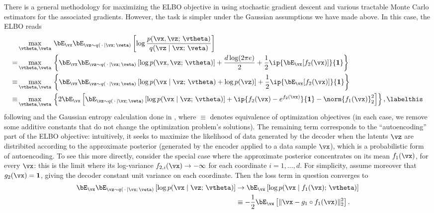 \documentclass[../../book-main.tex]{subfiles}
\begin{document}
There is a general methodology for maximizing the ELBO objective in
 using stochastic gradient descent and various tractable
Monte Carlo estimators for the associated gradients. However, the task is
simpler under the Gaussian assumptions we have made above. In this case, the
ELBO reads
\begin{align*}
&\max_{\vtheta, \veta}\,
\bE_{\vx}
\bE_{\vz \sim q(\,\cdot\, \mid \vx ;\, \veta)} \left[
  \log \frac{p(\vx, \vz;\, \vtheta)}{q(\vz \mid \vx;\, \veta)}
\right]\\
=&
\max_{\vtheta, \veta}\,
\left\{
  \bE_{\vx}
  \bE_{\vz \sim q(\,\cdot\, \mid \vx ;\, \veta)} \left[
    \log p(\vx, \vz;\, \vtheta)
  \right]
  + \frac{d \log(2\pi e)}{2}
  + \frac{1}{2} \ip{ \bE_{\vx}[f_2(\vx)]}{\mathbf{1}}
\right\}
\\
\equiv &
\max_{\vtheta, \veta}\,
\left\{
  \bE_{\vx}
  \bE_{\vz \sim q(\,\cdot\, \mid \vx ;\, \veta)} \left[
    \log p(\vx \mid \vz;\, \vtheta)
    + \log p(\vz)
  \right]
  + \frac{1}{2} \ip{ \bE_{\vx}[f_2(\vx)]}{\mathbf{1}}
\right\}
\\
\equiv &
\max_{\vtheta, \veta}\,
\left\{
  2\bE_{\vx}\left[
    \bE_{\vz \sim q(\,\cdot\, \mid \vx ;\, \veta)} \left[
      \log p(\vx \mid \vz;\, \vtheta)
    \right]
    + \ip{ f_2(\vx) - e^{f_2(\vx)}}{\mathbf{1}}
    - \norm{f_1(\vx)}_2^2
  \right]
\right\}, \labelthis \label{eq:elbo-for-gaussians}
\end{align*}
following  and the Gaussian entropy calculation done in , where $\equiv$
denotes equivalence of optimization objectives (in each case, we remove some
additive constants that do not change the optimization problem's solutions).
The remaining term corresponds to the ``autoencoding'' part of the ELBO
objective: intuitively, it seeks to maximize the likelihood of data generated by
the decoder when the latents $\vz$ are distribited according to the approximate
posterior (generated by the encoder applied to a data sample $\vx$), which is
a probabilistic form of autoencoding.
To see this more directly, consider the special case where the approximate
posterior concentrates on its mean $f_1(\vx)$, for every $\vx$: this
is the limit
where its log-variance $f_{2,i}(\vx) \to -\infty$ for each coordinate
$i = 1, \dots, d$.
For simplicity, assume moreover that $g_2(\vx) = \mathbf{1}$, giving the decoder
constant unit variance on each coordinate.
Then the loss term in question converges to
\begin{align*}
\bE_{\vx}
\bE_{\vz \sim q(\,\cdot\, \mid \vx ;\, \veta)} \left[
  \log p(\vx \mid \vz;\, \vtheta)
\right]
&\to
\bE_{\vx} \left[
  \log p(\vx \mid f_1(\vx);\, \vtheta)
\right]
\\
&\equiv
-\frac{1}{2} \bE_{\vx} \left[
  \|\vx - g_1\circ f_1(\vx)\|_2^2
\right].
\end{align*}
\end{document}
